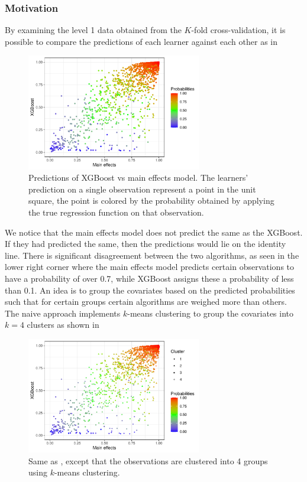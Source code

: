 \documentclass[./main.tex]{subfiles}
\begin{document}
\subsubsection{Motivation}
By examining the level 1 data obtained from the $ K $-fold cross-validation, it is possible to compare the predictions of each learner against each other as in 
\begin{figure}[H]
    \centering
    \includegraphics[width=0.68\textwidth]{figures/esl_preds_xgboost_vs_main.pdf}
    \caption{Predictions of XGBoost vs main effects model. The learners' prediction on a single observation represent a point in the unit square, the point is colored by the probability obtained by applying the true regression function on that observation.}
    \label{fig:esl_preds_xgboost_vs_main}
\end{figure}
We notice that the main effects model does not predict the same as the XGBoost. If they had predicted the same, then the predictions would lie on the identity line. There is significant disagreement between the two algorithms, as seen in the lower right corner where the main effects model predicts certain observations to have a probability of over 0.7, while XGBoost assigns these a probability of less than 0.1. An idea is to group the covariates based on the predicted probabilities such that for certain groups certain algorithms are weighed more than others. The naive approach implements $ k $-means clustering to group the covariates into $ k = 4 $ clusters as shown in  
\begin{figure}[H]
    \centering
    \includegraphics[width=0.68\textwidth]{figures/esl_preds_xgboost_vs_main_kmeans.pdf}
\caption{Same as , except that the observations are clustered into 4 groups using $ k $-means clustering.}
    \label{fig:esl_preds_xgboost_vs_main_kmeans}
\end{figure}
\end{document}
